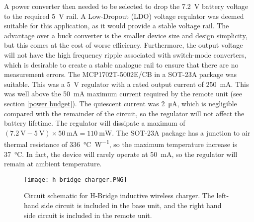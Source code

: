 A power converter then needed to be selected to drop the \SI{7.2}{\volt} battery voltage to the required \SI{5}{\volt} rail. A Low-Dropout (LDO) voltage regulator was deemed suitable for this application, as it would provide a stable voltage rail. The advantage over a buck converter is the smaller device size and design simplicity, but this comes at the cost of worse efficiency. Furthermore, the output voltage will not have the high frequency ripple associated with switch-mode converters, which is desirable to create a stable analogue rail to ensure that there are no measurement errors. The MCP1702T-5002E/CB \cite{mcp1702} in a SOT-23A package was suitable. This was a \SI{5}{\volt} regulator with a rated output current of \SI{250}{\milli\ampere}. This was well above the \SI{50}{\milli\ampere} maximum current required by the remote unit (see section \ref{power budget}). The quiescent current was \SI{2}{\micro\ampere}, which is negligible compared with the remainder of the circuit, so the regulator will not affect the battery lifetime. The regulator will dissipate a maximum of $(\SI{7.2}{\volt}-\SI{5}{\volt})\times\SI{50}{\milli\ampere}=\SI{110}{\milli\watt}$. The SOT-23A package has a junction to air thermal resistance of \SI{336}{\celsius\per\watt}, so the maximum temperature increase is \SI{37}{\celsius}. In fact, the device will rarely operate at \SI{50}{\milli\ampere}, so the regulator will remain at ambient temperature.\\

\begin{figure}[htbp]
	\centering
	\texttt{[image: h bridge charger.PNG]}
	\caption{Circuit schematic for H-Bridge inductive wireless charger. The left-hand side circuit is included in the base unit, and the right hand side circuit is included in the remote unit.}
	\label{fig: charger schematic}
\end{figure}
	

